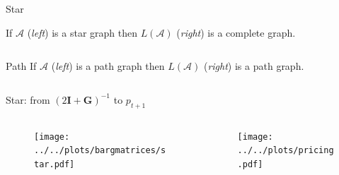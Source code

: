 \documentclass{beamer}
\newcommand{\matr}[1]{\bm{#1}}
\newcommand{\I}{\matr{I}}
\newcommand{\G}{\matr{G}}
\newcommand{\outdiag}{../thesis/sections/diagrams}
\begin{document}
\begin{frame}{Star}

    If $\mathcal{A}$ (\textit{left}) is a star graph then $L(\mathcal{A})$ (\textit{right}) is a complete graph. \vspace{5mm}

    \begin{columns}[T,onlytextwidth]

        \begin{column}{.46\textwidth}
            \resizebox{\linewidth}{!}{}
        \end{column}

        \hfill

        \begin{column}{.46\textwidth}
            \resizebox{\linewidth}{!}{}
        \end{column}
    \end{columns}
\end{frame}

\begin{frame}{Path}
    If $\mathcal{A}$ (\textit{left}) is a path graph then $L(\mathcal{A})$ (\textit{right}) is a path graph. \vspace{5mm}

    \begin{columns}[T,onlytextwidth]

        \begin{column}{.46\textwidth}
            \resizebox{\linewidth}{!}{}
        \end{column}

        \hfill

        \begin{column}{.46\textwidth}
            \resizebox{\linewidth}{!}{}
        \end{column}
    \end{columns}
\end{frame}


\begin{frame} {Star: from $(2\I + \G)^{-1}$ to $p_{t+1}$ }

    \begin{columns}
        \begin{column}{.47\textwidth}
            \begin{figure}
                \texttt{[image: ../../plots/bargmatrices/star.pdf]}
            \end{figure}
        \end{column}
        \begin{column}{.47\textwidth}
            \begin{figure}
                \texttt{[image: ../../plots/pricing.pdf]}
            \end{figure}
        \end{column}
    \end{columns}

\end{frame}
\end{document}
